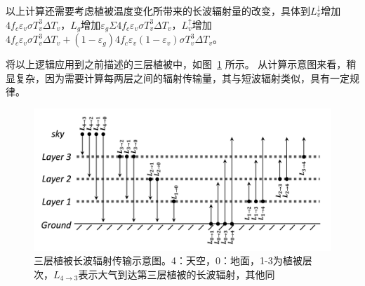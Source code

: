 以上计算还需要考虑植被温度变化所带来的长波辐射量的改变，具体到$L_v^\downarrow$增加$4f_c\varepsilon_v\sigma T_v^3\Delta T_v$，${L_{g}}$增加$\varepsilon_{g} \Sigma 4 f_{c} \varepsilon_{v} \sigma T_{v}^{3} \Delta T_{v}$，$L_v ^\uparrow$增加$4 f_{c} \varepsilon_{v} \sigma T_{v}^{3} \Delta T_{v}+(1-\varepsilon_{g}) 4 f_{c} 
\varepsilon_{v}(1-\varepsilon_{v}) \sigma T_{v}^{3} \Delta T_{v}$。

将以上逻辑应用到之前描述的三层植被中，如图~\ref{fig:三层植被长波辐射传输示意图} 所示。
从计算示意图来看，稍显复杂，因为需要计算每两层之间的辐射传输量，其与短波辐射类似，具有一定规律。
%
{
\begin{figure}[htbp]
\centering
\includegraphics[width=0.8\columnwidth]{Figures/辐射过程及辐射通量计算/三层植被长波辐射传输示意图.png}
\caption[三层植被长波辐射传输示意图]{三层植被长波辐射传输示意图。4：天空，0：地面，1-3为植被层次，$L_{4 \rightarrow 3}$表示大气到达第三层植被的长波辐射，其他同}
\label{fig:三层植被长波辐射传输示意图}
\end{figure}
}
%

